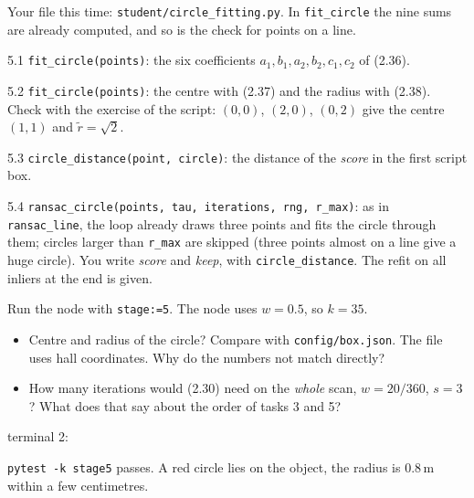 \documentclass[11pt,a4paper,parskip=half]{scrartcl}
\newcommand{\thema}[1]{\texttt{#1}}
\newcommand{\datei}[1]{\texttt{#1}}
\newcommand{\expected}[2][]{\begin{seebox}
  \begin{minipage}[c]{0.36\linewidth}\resizebox{\linewidth}{!}{}\end{minipage}%
  \hfill
  \begin{minipage}[c]{0.615\linewidth}
    {\footnotesize\color{ohmgrey}#1terminal 2:}
    
  \end{minipage}
\end{seebox}}
\begin{document}
\begin{note}
Your file this time: \datei{student/circle\_fitting.py}. In \thema{fit\_circle} the nine sums are already
computed, and so is the check for points on a line.
\end{note}

\begin{todo}{5.1}
\thema{fit\_circle(points)}: the six coefficients \(a_1, b_1, a_2, b_2, c_1, c_2\) of (2.36).
\end{todo}

\begin{todo}{5.2}
\thema{fit\_circle(points)}: the centre with (2.37) and the radius with (2.38). Check with the exercise of
the script: \((0, 0)\), \((2, 0)\), \((0, 2)\) give the centre \((1, 1)\) and \(\tilde r = \sqrt 2\).
\end{todo}

\begin{todo}{5.3}
\thema{circle\_distance(point, circle)}: the distance of the \emph{score} in the first script box.
\end{todo}

\begin{todo}{5.4}
\thema{ransac\_circle(points, tau, iterations, rng, r\_max)}: as in \thema{ransac\_line}, the loop already
draws three points and fits the circle through them; circles larger than \thema{r\_max} are skipped
(three points almost on a line give a huge circle). You write \emph{score} and \emph{keep}, with
\thema{circle\_distance}. The refit on all inliers at the end is given.
\end{todo}

Run the node with \thema{stage:=5}. The node uses \(w = 0.5\), so \(k = 35\).
\begin{itemize}
  \item Centre and radius of the circle? Compare with \datei{config/box.json}. The file uses hall
        coordinates. Why do the numbers not match directly?
  \item How many iterations would (2.30) need on the \emph{whole} scan, \(w = 20/360\), \(s = 3\)? What
        does that say about the order of tasks 3 and 5?
\end{itemize}

\expected[]{stage5}

\begin{checkpoint}
\thema{pytest -k stage5} passes. A red circle lies on the object, the radius is \(0.8\,\mathrm{m}\) within a
few centimetres.
\end{checkpoint}
\end{document}
